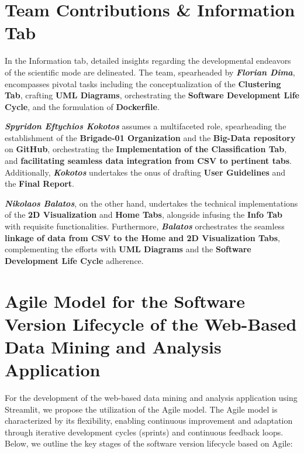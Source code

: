 \documentclass[unnumsec,webpdf,contemporary,large]{oup-authoring-template}%
\theoremstyle{thmstyleone}%
\theoremstyle{thmstyletwo}%
\theoremstyle{thmstylethree}%
\begin{document}
\section{Team Contributions \& Information Tab}\label{sec3}
\vspace{0.2cm}

In the Information tab, detailed insights regarding the developmental endeavors of the scientific mode are delineated. The team, spearheaded by \textbf{\textit{Florian Dima}}, encompasses pivotal tasks including the conceptualization of the \textbf{Clustering Tab}, crafting \textbf{UML Diagrams}, orchestrating the \textbf{Software Development Life Cycle}, and the formulation of \textbf{Dockerfile}. 
\vspace{0.1cm}

\textbf{\textit{Spyridon Eftychios Kokotos}} assumes a multifaceted role, spearheading the establishment of the \textbf{Brigade-01 Organization} and the \textbf{Big-Data repository} on \textbf{GitHub}, orchestrating the \textbf{Implementation of the Classification Tab}, and \textbf{facilitating seamless data integration from CSV to pertinent tabs}. Additionally, \textbf{\textit{Kokotos}} undertakes the onus of drafting \textbf{User Guidelines} and the \textbf{Final Report}. 
\vspace{0.2cm}

\textbf{\textit{Nikolaos Balatos}}, on the other hand, undertakes the technical implementations of the \textbf{2D Visualization} and \textbf{Home Tabs}, alongside infusing the \textbf{Info Tab} with requisite functionalities. Furthermore, \textbf{\textit{Balatos}} orchestrates the seamless \textbf{linkage of data from CSV to the Home and 2D Visualization Tabs}, complementing the efforts with \textbf{UML Diagrams} and the \textbf{Software Development Life Cycle} adherence.
\vspace{0.2cm}

\section{Agile Model for the Software Version Lifecycle of the Web-Based Data Mining and Analysis Application}
\vspace{0.2cm}

For the development of the web-based data mining and analysis application using Streamlit, we propose the utilization of the Agile model. The Agile model is characterized by its flexibility, enabling continuous improvement and adaptation through iterative development cycles (sprints) and continuous feedback loops. Below, we outline the key stages of the software version lifecycle based on Agile:
\vspace{0.2cm}
\end{document}
